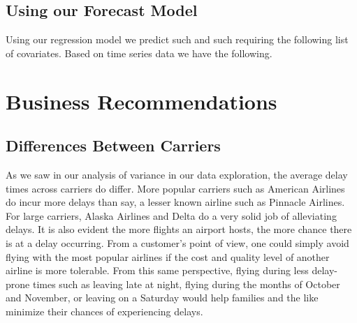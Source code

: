 \documentclass[12pt, a4paper, openany]{book}
\newcommand\tab[1][1cm]{\hspace*{#1}}
\begin{document}
	\section{Using our Forecast Model}
	\tab Using our regression  model we predict  such and such requiring the following list of covariates. Based on time series data we have the following.
\chapter{Business Recommendations}
	\section{Differences Between Carriers}
	\tab As we saw in our analysis of variance in our data exploration, the average delay times across carriers do differ. More popular carriers such as American Airlines do incur more delays than say, a lesser known airline such as Pinnacle Airlines. For large carriers, Alaska Airlines and Delta do a very solid job of alleviating delays. It is also evident the more flights an airport hosts, the more chance there is at a delay occurring. From a customer’s point of view, one could simply avoid flying with the most popular airlines if the cost and quality level of another airline is more tolerable. From this same perspective, flying during less delay-prone times such as leaving late at night, flying during the months of October and November, or leaving on a Saturday would help families and the like minimize their chances of experiencing delays. 
\end{document}
